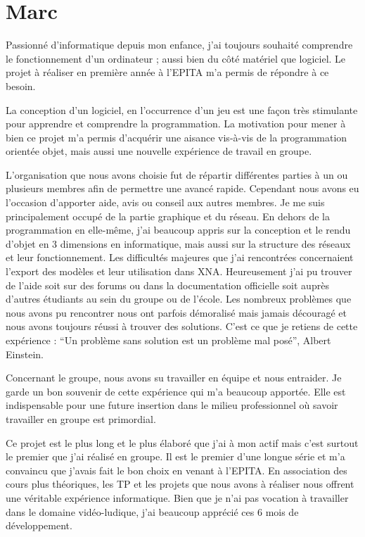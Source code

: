 \documentclass[11pt]{report}
\begin{document}
\section{Marc}

Passionné d’informatique depuis mon enfance, j’ai toujours souhaité comprendre le fonctionnement d’un ordinateur ; aussi bien du côté matériel que logiciel. Le projet à réaliser en première année à l’EPITA m’a permis de répondre à ce besoin.

La conception d’un logiciel, en l’occurrence d’un jeu est une façon très stimulante pour apprendre et comprendre la programmation. La motivation pour mener à bien ce projet m’a permis d’acquérir une aisance vis-à-vis de la programmation orientée objet, mais aussi une nouvelle expérience de travail en groupe.

L’organisation que nous avons choisie fut de répartir différentes parties à un ou plusieurs membres afin de permettre une avancé rapide. Cependant nous avons eu l’occasion d’apporter aide, avis ou conseil aux autres membres.  Je me suis principalement occupé de la partie graphique et du réseau. En dehors de la programmation en elle-même, j’ai beaucoup appris sur la conception et le rendu d’objet en 3 dimensions en informatique, mais aussi sur la structure des réseaux et leur fonctionnement. Les difficultés majeures que j’ai rencontrées concernaient l’export des modèles et leur utilisation dans XNA. Heureusement j’ai pu trouver de l’aide soit sur des forums ou dans la documentation officielle soit auprès d’autres étudiants au sein du groupe ou de l’école. Les nombreux problèmes que nous avons pu rencontrer nous ont parfois démoralisé mais jamais découragé et nous avons toujours réussi à trouver des solutions. C’est ce que je retiens de cette expérience : ``Un problème sans solution est un problème mal posé'', Albert Einstein.

Concernant le groupe, nous avons su travailler en équipe et nous entraider. Je garde un bon souvenir de cette expérience qui m’a beaucoup apportée. Elle est indispensable pour une future insertion dans le milieu professionnel où savoir travailler en groupe est primordial.

Ce projet est le plus long et le plus élaboré que j’ai à mon actif mais c’est surtout le premier que j’ai réalisé en groupe. Il est le premier d’une longue série et m’a convaincu que j’avais fait le bon choix en venant à l’EPITA. En association des cours plus théoriques, les TP et les projets que nous avons à réaliser nous offrent une véritable expérience informatique. Bien que je n’ai pas vocation à travailler dans le domaine vidéo-ludique, j’ai beaucoup apprécié ces 6 mois de développement.
\end{document}

